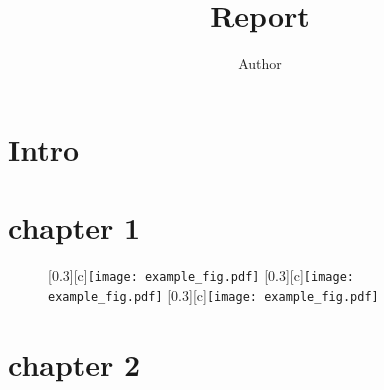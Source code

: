 \documentclass[a4paper, 12pt]{article}
\title{Report}
\author{Author}
\begin{document}
\maketitle
\sloppy
\section*{Intro}
\section{chapter 1}
\begin{figure}[htbp]
\centering
{}[0.3\linewidth][c]{\texttt{[image: example\_fig.pdf]}}
[0.3\linewidth][c]{\texttt{[image: example\_fig.pdf]}}
[0.3\linewidth][c]{\texttt{[image: example\_fig.pdf]}}
\caption{\label{fig:example}\cite{example_ref}}
\end{figure}

\section{chapter 2}
\printbibliography
\end{document}
